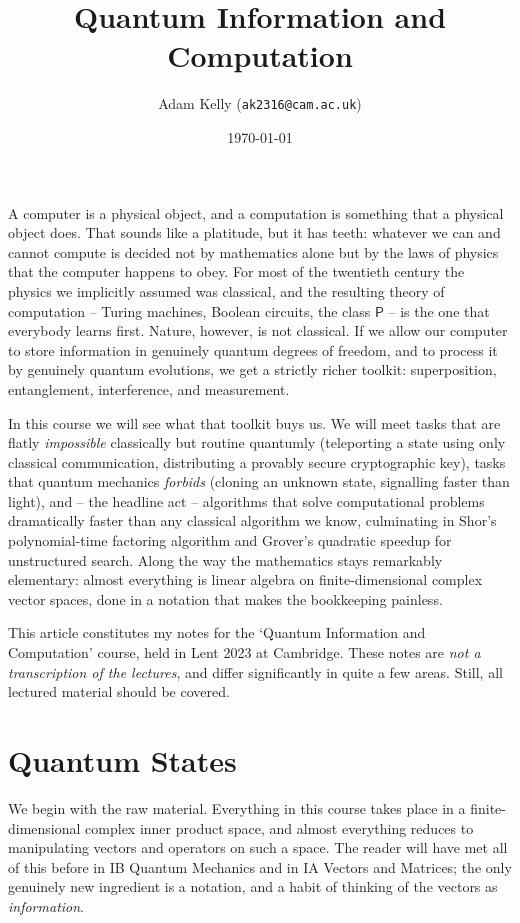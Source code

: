 \documentclass[a4paper]{scrartcl}
\title{Quantum Information and Computation}
\author{Adam Kelly (\texttt{ak2316@cam.ac.uk})}
\date{\today}
\newcommand{\class}[1]{\mathsf{#1}}
\begin{document}
\maketitle

A computer is a physical object, and a computation is something that a physical object does. That sounds like a platitude, but it has teeth: whatever we can and cannot compute is decided not by mathematics alone but by the laws of physics that the computer happens to obey. For most of the twentieth century the physics we implicitly assumed was classical, and the resulting theory of computation -- Turing machines, Boolean circuits, the class $\class{P}$ -- is the one that everybody learns first. Nature, however, is not classical. If we allow our computer to store information in genuinely quantum degrees of freedom, and to process it by genuinely quantum evolutions, we get a strictly richer toolkit: superposition, entanglement, interference, and measurement.

In this course we will see what that toolkit buys us. We will meet tasks that are flatly \emph{impossible} classically but routine quantumly (teleporting a state using only classical communication, distributing a provably secure cryptographic key), tasks that quantum mechanics \emph{forbids} (cloning an unknown state, signalling faster than light), and -- the headline act -- algorithms that solve computational problems dramatically faster than any classical algorithm we know, culminating in Shor's polynomial-time factoring algorithm and Grover's quadratic speedup for unstructured search. Along the way the mathematics stays remarkably elementary: almost everything is linear algebra on finite-dimensional complex vector spaces, done in a notation that makes the bookkeeping painless.

This article constitutes my notes for the `Quantum Information and Computation' course, held in Lent 2023 at Cambridge. These notes are \emph{not a transcription of the lectures}, and differ significantly in quite a few areas. Still, all lectured material should be covered.

\tableofcontents

\section{Quantum States}

We begin with the raw material. Everything in this course takes place in a finite-dimensional complex inner product space, and almost everything reduces to manipulating vectors and operators on such a space. The reader will have met all of this before in IB Quantum Mechanics and in IA Vectors and Matrices; the only genuinely new ingredient is a notation, and a habit of thinking of the vectors as \emph{information}.
\end{document}
